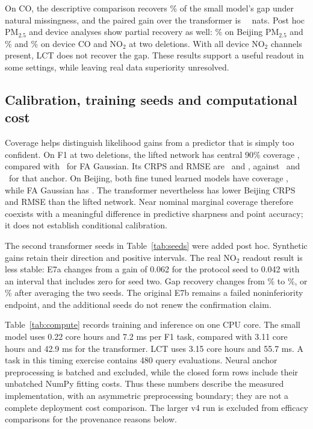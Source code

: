 On CO, the descriptive comparison recovers \VthreebeijingcoeZerorecovered\% of the small model's gap under natural missingness, and the paired gain over the transformer is \VthreebeijingcoeZerolctvspfn\ \VthreebeijingcoeZerolctvspfnci\ nats. Post hoc PM$_{2.5}$ and device analyses show partial recovery as well: \Xplctpmrecovered\% on Beijing PM$_{2.5}$ and \XplctairqcoeTworecovered\% and \XplctairqnoTwoeTworecovered\% on device CO and NO$_2$ at two deletions. With all device NO$_2$ channels present, LCT does not recover the gap. These results support a useful readout in some settings, while leaving real data superiority unresolved.

\subsection{Calibration, training seeds and computational cost}





Coverage helps distinguish likelihood gains from a predictor that is simply too confident. On F1 at two deletions, the lifted network has central 90\% coverage \CalliftOneFcov, compared with \CalfaOneFcov\ for FA Gaussian. Its CRPS and RMSE are \CalliftOneFcrps\ and \CalliftOneFrmse, against \CalfaOneFcrps\ and \CalfaOneFrmse\ for that anchor. On Beijing, both fine tuned learned models have coverage \CalliftOneBcov, while FA Gaussian has \CalfaOneBcov. The transformer nevertheless has lower Beijing CRPS and RMSE than the lifted network. Near nominal marginal coverage therefore coexists with a meaningful difference in predictive sharpness and point accuracy; it does not establish conditional calibration.

The second transformer seeds in Table~\ref{tab:seeds} were added post hoc. Synthetic gains retain their direction and positive intervals. The real NO$_2$ readout result is less stable: E7a changes from a gain of 0.062 for the protocol seed to 0.042 with an interval that includes zero for seed two. Gap recovery changes from \VthreebeijingnoTwoeZerorecovered\% to \Vthreeseedtworecovered\%, or \Vthreeseedavgrecovered\% after averaging the two seeds. The original E7b remains a failed noninferiority endpoint, and the additional seeds do not renew the confirmation claim.

Table~\ref{tab:compute} records training and inference on one CPU core. The small model uses 0.22 core hours and 7.2 ms per F1 task, compared with 3.11 core hours and 42.9 ms for the transformer. LCT uses 3.15 core hours and 55.7 ms. A task in this timing exercise contains 480 query evaluations. Neural anchor preprocessing is batched and excluded, while the closed form rows include their unbatched NumPy fitting costs. Thus these numbers describe the measured implementation, with an asymmetric preprocessing boundary; they are not a complete deployment cost comparison. The larger v4 run is excluded from efficacy comparisons for the provenance reasons below.
